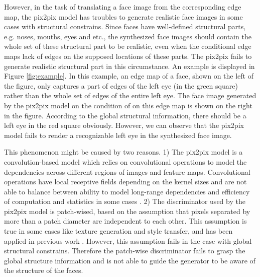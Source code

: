 However, in the task of translating a face image from the corresponding edge map, the pix2pix model has troubles to generate realistic face images in some cases with structural constrains. Since faces have well-defined structural parts, e.g. noses, mouths, eyes and etc., the synthesized face images should contain the whole set of these structural part to be realistic, even when the conditional edge maps lack of edges on the supposed locations of these parts. The pix2pix fails to generate realistic structural part in this circumstance.
An example is displayed in Figure \ref{fig:example}. In this example, an edge map of a face, shown on the left of the figure, only captures a part of edges of the left eye (in the green square) rather than the whole set of edges of the entire left eye. The face image generated by the pix2pix model on the condition of on this edge map is shown on the right in the figure. According to the global structural information, there should be a left eye in the red square obviously. However, we can observe that the pix2pix model fails to render a recognizable left eye in the synthesized face image. 

This phenomenon might be caused by two reasons. 
1) The pix2pix model is a convolution-based model which relies on convolutional operations to model the dependencies across different regions of images and feature maps. Convolutional operations have local receptive fields depending on the kernel sizes and are not able to balance between ability to model long-range dependencies and efficiency of computation and statistics in some cases \cite{SAGANs}.
2) The discriminator used by the pix2pix model is patch-wised, based on the assumption that pixels separated by more than a patch diameter are independent to each other. This assumption is true in some cases like texture generation and style transfer, and has been applied in previous work \cite{texture_markovian, styel_transfer}. However, this assumption fails in the case with global structural constrains. Therefore the patch-wise discriminator fails to grasp the global structure information and is not able to guide the generator to be aware of the structure of the faces.

